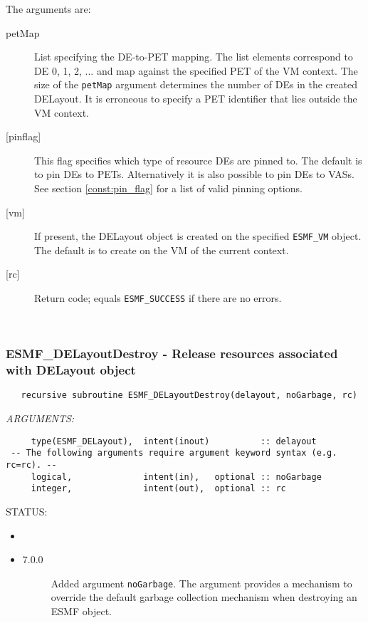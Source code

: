        The arguments are:
       \begin{description}
       \item[petMap]
            List specifying the DE-to-PET mapping. The list elements correspond 
            to DE 0, 1, 2, ... and map against the specified PET of the VM
            context. The size of the {\tt petMap} 
            argument determines the number of DEs in the created DELayout. It is
            erroneous to specify a PET identifier that lies outside the VM 
            context.
       \item[{[pinflag]}]
            This flag specifies which type of resource DEs are pinned to. 
            The default is to pin DEs to PETs. Alternatively it is
            also possible to pin DEs to VASs. See section 
            \ref{const:pin_flag} for a list of valid pinning options.
       \item[{[vm]}]
            If present, the DELayout object is created on the specified 
            {\tt ESMF\_VM} object. The default is to create on the VM of the 
            current context.
       \item[{[rc]}]
            Return code; equals {\tt ESMF\_SUCCESS} if there are no errors.
       \end{description}
   
 
\mbox{}\hrulefill\ 
 
\subsubsection [ESMF\_DELayoutDestroy] {ESMF\_DELayoutDestroy - Release resources associated with DELayout object}


 
\begin{verbatim}   recursive subroutine ESMF_DELayoutDestroy(delayout, noGarbage, rc)\end{verbatim}{\em ARGUMENTS:}
\begin{verbatim}     type(ESMF_DELayout),  intent(inout)          :: delayout
 -- The following arguments require argument keyword syntax (e.g. rc=rc). --
     logical,              intent(in),   optional :: noGarbage
     integer,              intent(out),  optional :: rc  \end{verbatim}
{\sf STATUS:}
   \begin{itemize}
   \item{}
   \item{}
   \begin{description}
   \item[7.0.0] Added argument {\tt noGarbage}.
     The argument provides a mechanism to override the default garbage collection
     mechanism when destroying an ESMF object.
   \end{description}
   \end{itemize}
  
